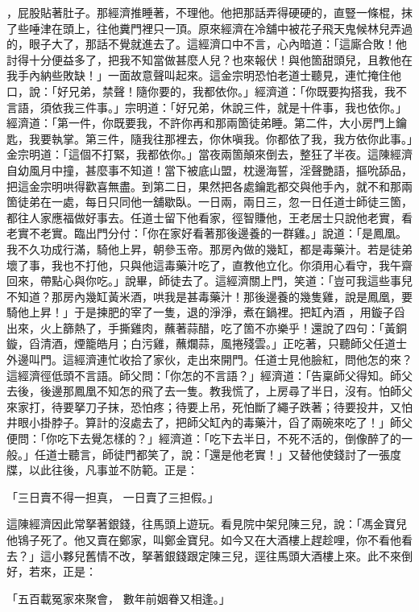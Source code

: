 \begin{showcontents}{}
，屁股貼著肚子。那經濟推睡著，不理他。他把那話弄得硬硬的，直豎一條棍，抹了些唾津在頭上，往他糞門裡只一頂。原來經濟在冷舖中被花子飛天鬼候林兒弄過的，眼子大了，那話不覺就進去了。這經濟口中不言，心內暗道：「這廝合敗！他討得十分便益多了，把我不知當做甚麼人兒？也來報伏！與他箇甜頭兒，且教他在我手內納些敗缺！」一面故意聲叫起來。這金宗明恐怕老道士聽見，連忙掩住他口，說：「好兄弟，禁聲！隨你要的，我都依你。」經濟道：「你既要抅搭我，我不言語，須依我三件事。」宗明道：「好兄弟，休說三件，就是十件事，我也依你。」經濟道：「第一件，你既要我，不許你再和那兩箇徒弟睡。第二件，大小房門上鑰匙，我要執掌。第三件，隨我往那裡去，你休嗔我。你都依了我，我方依你此事。」金宗明道：「這個不打緊，我都依你。」當夜兩箇顛來倒去，整狂了半夜。這陳經濟自幼風月中撞，甚麼事不知道！當下被底山盟，枕邊海誓，淫聲艷語，摳吮舔品，把這金宗明哄得歡喜無盡。到第二日，果然把各處鑰匙都交與他手內，就不和那兩箇徒弟在一處，每日只同他一舖歇臥。一日兩，兩日三，忽一日任道士師徒三箇，都往人家應福做好事去。任道士留下他看家，徑智賺他，王老居士只說他老實，看老實不老實。臨出門分付：「你在家好看著那後邊養的一群雞。」說道：「是鳳凰。我不久功成行滿，騎他上昇，朝參玉帝。那房內做的幾缸，都是毒藥汁。若是徒弟壞了事，我也不打他，只與他這毒藥汁吃了，直教他立化。你須用心看守，我午齋回來，帶點心與你吃。」說畢，師徒去了。這經濟關上門，笑道：「豈可我這些事兒不知道？那房內幾缸黃米酒，哄我是甚毒藥汁！那後邊養的幾隻雞，說是鳳凰，要騎他上昇！」于是揀肥的宰了一隻，退的淨淨，煮在鍋裡。把缸內酒 ，用鏇子舀出來，火上篩熱了，手撕雞肉，蘸著蒜醋，吃了箇不亦樂乎！還說了四句：「黃銅鏇，舀清酒，煙籠皓月；白污雞，蘸爛蒜，風捲殘雲。」正吃著，只聽師父任道士外邊叫門。這經濟連忙收拾了家伙，走出來開門。任道士見他臉紅，問他怎的來？這經濟徑低頭不言語。師父問：「你怎的不言語？」經濟道：「告稟師父得知。師父去後，後邊那鳳凰不知怎的飛了去一隻。教我慌了，上房尋了半日，沒有。怕師父來家打，待要拏刀子抹，恐怕疼；待要上吊，死怕斷了繩子跌著；待要投井，又怕井眼小掛脖子。算計的沒處去了，把師父缸內的毒藥汁，舀了兩碗來吃了！」師父便問：「你吃下去覺怎樣的？」經濟道：「吃下去半日，不死不活的，倒像醉了的一般。」任道士聽言，師徒門都笑了，說：「還是他老實！」又替他使錢討了一張度牒，以此往後，凡事並不防範。正是：

「三日賣不得一担真，  一日賣了三担假。」

這陳經濟因此常拏著銀錢，往馬頭上遊玩。看見院中架兒陳三兒，說：「馮金寶兒他鴇子死了。他又賣在鄭家，叫鄭金寶兒。如今又在大酒樓上趕趁哩，你不看他看去？」這小夥兒舊情不改，拏著銀錢跟定陳三兒，逕往馬頭大酒樓上來。此不來倒好，若來，正是：

「五百載冤家來聚會，  數年前姻眷又相逢。」


\end{showcontents}
